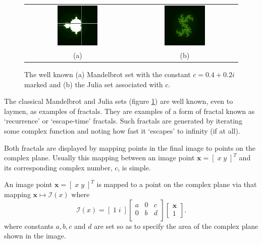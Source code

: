 \begin{figure}
\centering
\begin{tabular}{c@{$\quad$}c}
\includegraphics[width=0.4\textwidth]{euc_mandel_julia_pos} 
 & \includegraphics[width=0.4\textwidth]{julia_euc} \\
                          (a) & (b)
\end{tabular}
\caption{\label{fig:euclidean_sets}The well known (a) Mandelbrot set with
  the constant $c = 0.4 + 0.2i$ marked and (b) the Julia
  set associated with $c$.}
\end{figure}

The classical Mandelbrot and Julia sets (figure \ref{fig:euclidean_sets}) are
well known, even to laymen, as examples of fractals. They are
examples of a form of fractal known as `recurrence' or `escape-time'
fractals.  Such fractals are generated by iterating some complex function and
noting how fast it `escapes' to infinity (if at all).

Both fractals are displayed by mapping points in the final image to points on the
complex plane. Usually this mapping between an image point $\mathbf{x} = [\; x\;y \;]^T$ and
its corresponding complex number, $c$, is simple.

\begin{definition}
An image point $\mathbf{x} = [\; x\;y \;]^T$ is mapped to a point on the 
complex plane via that mapping $\mathbf{x} \mapsto {\mathcal I}(x)$ where
\[
{\mathcal I}(x) = [\; 1 \; i \;] \left[ 
  \begin{array}{ccc}
a & 0 & c \\
0 & b & d \\
  \end{array}
\right]
\left[
  \begin{array}{c}
  \mathbf{x} \\ 1
  \end{array}
\right].
\]
where constants $a,b,c$ and $d$ are set so as to specify the area of the complex 
plane shown in the image.
\end{definition}

